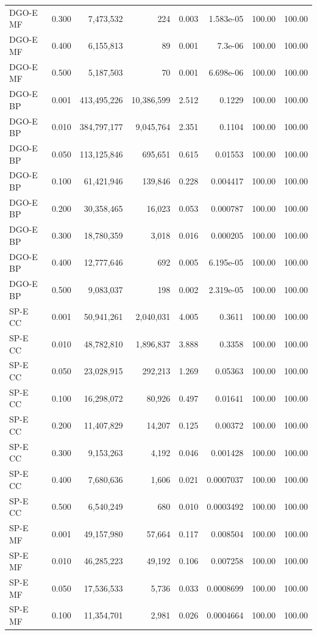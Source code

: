 \begin{longtable}{lrrrrrrr}
DGO-E MF & 0.300 & 7,473,532 & 224 & 0.003 & 1.583e-05 & 100.00 & 100.00 \\
DGO-E MF & 0.400 & 6,155,813 & 89 & 0.001 & 7.3e-06 & 100.00 & 100.00 \\
DGO-E MF & 0.500 & 5,187,503 & 70 & 0.001 & 6.698e-06 & 100.00 & 100.00 \\
DGO-E BP & 0.001 & 413,495,226 & 10,386,599 & 2.512 & 0.1229 & 100.00 & 100.00 \\
DGO-E BP & 0.010 & 384,797,177 & 9,045,764 & 2.351 & 0.1104 & 100.00 & 100.00 \\
DGO-E BP & 0.050 & 113,125,846 & 695,651 & 0.615 & 0.01553 & 100.00 & 100.00 \\
DGO-E BP & 0.100 & 61,421,946 & 139,846 & 0.228 & 0.004417 & 100.00 & 100.00 \\
DGO-E BP & 0.200 & 30,358,465 & 16,023 & 0.053 & 0.000787 & 100.00 & 100.00 \\
DGO-E BP & 0.300 & 18,780,359 & 3,018 & 0.016 & 0.000205 & 100.00 & 100.00 \\
DGO-E BP & 0.400 & 12,777,646 & 692 & 0.005 & 6.195e-05 & 100.00 & 100.00 \\
DGO-E BP & 0.500 & 9,083,037 & 198 & 0.002 & 2.319e-05 & 100.00 & 100.00 \\
SP-E CC & 0.001 & 50,941,261 & 2,040,031 & 4.005 & 0.3611 & 100.00 & 100.00 \\
SP-E CC & 0.010 & 48,782,810 & 1,896,837 & 3.888 & 0.3358 & 100.00 & 100.00 \\
SP-E CC & 0.050 & 23,028,915 & 292,213 & 1.269 & 0.05363 & 100.00 & 100.00 \\
SP-E CC & 0.100 & 16,298,072 & 80,926 & 0.497 & 0.01641 & 100.00 & 100.00 \\
SP-E CC & 0.200 & 11,407,829 & 14,207 & 0.125 & 0.00372 & 100.00 & 100.00 \\
SP-E CC & 0.300 & 9,153,263 & 4,192 & 0.046 & 0.001428 & 100.00 & 100.00 \\
SP-E CC & 0.400 & 7,680,636 & 1,606 & 0.021 & 0.0007037 & 100.00 & 100.00 \\
SP-E CC & 0.500 & 6,540,249 & 680 & 0.010 & 0.0003492 & 100.00 & 100.00 \\
SP-E MF & 0.001 & 49,157,980 & 57,664 & 0.117 & 0.008504 & 100.00 & 100.00 \\
SP-E MF & 0.010 & 46,285,223 & 49,192 & 0.106 & 0.007258 & 100.00 & 100.00 \\
SP-E MF & 0.050 & 17,536,533 & 5,736 & 0.033 & 0.0008699 & 100.00 & 100.00 \\
SP-E MF & 0.100 & 11,354,701 & 2,981 & 0.026 & 0.0004664 & 100.00 & 100.00 \\

\end{longtable}
